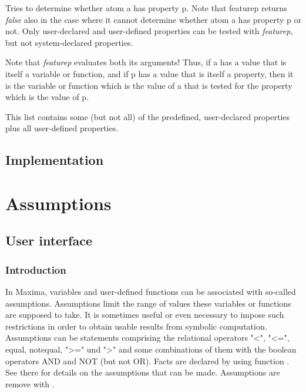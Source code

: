 \documentclass[../Maxima_Workbook.tex]{subfiles}
\begin{document}
\lzz {} \hfill {}

\lz Tries to determine whether atom a has property p. Note that featurep returns \emph{false} also in the case where it cannot determine whether atom a has property p or not. Only user-declared and user-defined properties can be tested with \emph{featurep}, but not system-declared properties.

\lz Note that \emph{featurep} evaluates both its arguments! Thus, if a has a value that is itself a variable or function, and if p has a value that is itself a property, then it is the variable or function which is the value of a that is tested for the property which is the value of p.

\lzz \hypertarget{features}{} \hfill {}

\lz This list contains some (but not all) of the predefined, user-declared properties plus all user-defined properties.

\subsection{Implementation}

\section{Assumptions}\label{Db2}

\subsection{User interface}

\subsubsection{Introduction}

In Maxima, variables and user-defined functions can be associated with so-called assumptions. Assumptions limit the range of values these variables or functions are supposed to take. It is sometimes useful or even necessary to impose such restrictions in order to obtain usable results from symbolic computation. Assumptions can be statements comprising the relational operators "<", "<=", equal, notequal, ">=" und ">" and some combinations of them with the boolean operators AND and NOT (but not OR). Facts are declared by using function . See there for details on the assumptions that can be made. Assumptions are remove with . 
\end{document}
